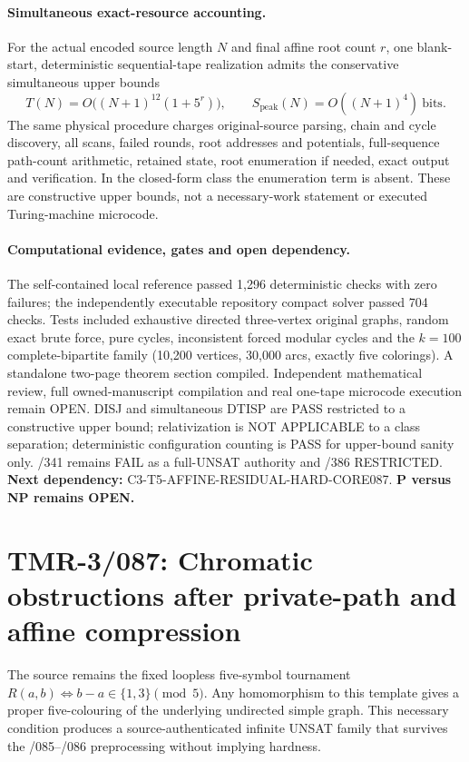 \documentclass[11pt]{article}
\begin{document}
\paragraph{Simultaneous exact-resource accounting.}
For the actual encoded source length $N$ and final affine
root count $r$, one blank-start, deterministic sequential-tape
realization admits the conservative simultaneous upper bounds
\[
T(N)=O\big((N+1)^{12}(1+5^r)\big),\qquad
S_{\mathrm{peak}}(N)=O((N+1)^4)\ \text{bits}.
\]
The same physical procedure charges original-source parsing,
chain and cycle discovery, all scans, failed rounds, root
addresses and potentials, full-sequence path-count arithmetic,
retained state, root enumeration if needed, exact output and
verification. In the closed-form class the enumeration term
is absent. These are constructive upper bounds, not a
necessary-work statement or executed Turing-machine microcode.

\paragraph{Computational evidence, gates and open dependency.}
The self-contained local reference passed 1,296 deterministic
checks with zero failures; the independently executable
repository compact solver
passed 704 checks. Tests included exhaustive directed
three-vertex original graphs, random exact brute force,
pure cycles, inconsistent forced modular cycles and the
$k=100$ complete-bipartite family (10,200 vertices,
30,000 arcs, exactly five colorings). A standalone
two-page theorem section compiled. Independent mathematical
review, full owned-manuscript compilation and real
one-tape microcode execution remain OPEN. DISJ and
simultaneous DTISP are PASS restricted to a constructive
upper bound; relativization is NOT APPLICABLE to a
class separation; deterministic configuration counting
is PASS for upper-bound sanity only. /341 remains FAIL
as a full-UNSAT authority and /386 RESTRICTED.
\textbf{Next dependency:} C3-T5-AFFINE-RESIDUAL-HARD-CORE087.
\textbf{P versus NP remains OPEN.}


\section{TMR-3/087: Chromatic obstructions after private-path and affine compression}

The source remains the fixed loopless five-symbol tournament
$R(a,b)\Longleftrightarrow b-a\in\{1,3\}\pmod5$.
Any homomorphism to this template gives a proper five-colouring of
the underlying undirected simple graph. This necessary condition
produces a source-authenticated infinite UNSAT family that survives
the /085--/086 preprocessing without implying hardness.
\end{document}
